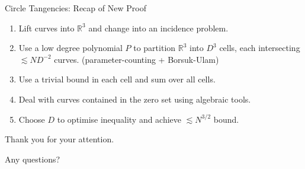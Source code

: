 \documentclass{beamer}
\newcommand{\RR}{\mathbb R}
\newcommand{\nfr}[1]{\begin{frame} #1
\end{frame}}
\begin{document}
\nfr{{Circle Tangencies: Recap of New Proof}

\begin{enumerate}
    \item Lift curves into $\RR^3$ and change into an incidence problem.
    \item Use a low degree polynomial $P$ to partition $\RR^3$ into $D^3$ cells, each intersecting $\lesssim ND^{-2}$ curves. (parameter-counting + Borsuk-Ulam)
    \item Use a trivial bound in each cell and sum over all cells.
    \item Deal with curves contained in the zero set using algebraic tools. 
    \item Choose $D$ to optimise inequality and achieve $\lesssim N^{3/2}$ bound.
\end{enumerate}
}
\nfr{{}
\begin{center}
Thank you for your attention.

Any questions? 

\end{center}
}




\end{document}
